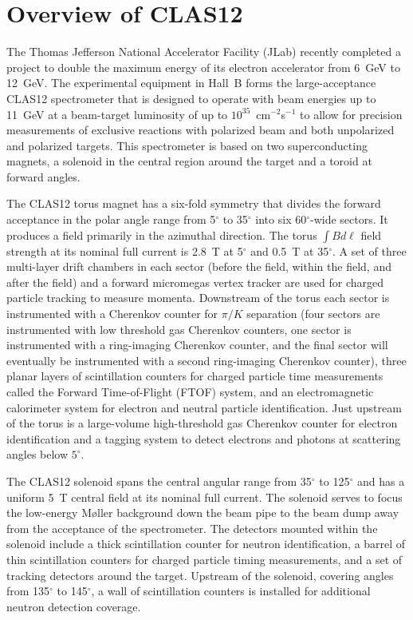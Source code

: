 \documentclass{elsart}
\begin{document}


\section{Overview of CLAS12}

The Thomas Jefferson National Accelerator Facility (JLab) recently completed a project to 
double the maximum energy of its electron accelerator from 6~GeV to 12~GeV. The experimental 
equipment in Hall~B forms the large-acceptance CLAS12 spectrometer that is designed to operate 
with beam energies up to 11~GeV at a beam-target luminosity of up to $10^{35}$~cm$^{-2}$s$^{-1}$
to allow for precision measurements of exclusive reactions with polarized beam and both unpolarized
and polarized targets. This spectrometer is based on two superconducting magnets, a solenoid in the
central region around the target and a toroid at forward angles. 

The CLAS12 torus magnet has a six-fold symmetry that divides the forward acceptance in the polar angle
range from 5$^\circ$ to 35$^\circ$ into six 60$^\circ$-wide sectors. It produces a field primarily in
the azimuthal direction. The torus $\int \!B d\ell$ field strength at its nominal full current is 2.8~T
at 5$^\circ$ and 0.5~T at 35$^\circ$. A set of three multi-layer drift chambers in each sector (before
the field, within the field, and after the field) and a forward micromegas vertex tracker are used for
charged particle tracking to measure momenta. Downstream of the torus each sector is instrumented with
a Cherenkov counter for $\pi/K$ separation (four sectors are instrumented with low threshold gas Cherenkov
counters, one sector is instrumented with a ring-imaging Cherenkov counter, and the final sector will eventually
be instrumented with a second ring-imaging Cherenkov counter), three planar layers of scintillation counters
for charged particle time measurements called the Forward Time-of-Flight (FTOF) system, and an
electromagnetic calorimeter system for electron and neutral particle identification. Just upstream of the torus
is a large-volume high-threshold gas Cherenkov counter for electron identification and a tagging system to
detect electrons and photons at scattering angles below $5^\circ$.

The CLAS12 solenoid spans the central angular range from 35$^\circ$ to 125$^\circ$ and has a uniform
5~T central field at its nominal full current. The solenoid serves to focus the low-energy M{\o}ller
background down the beam pipe to the beam dump away from the acceptance of the spectrometer. The
detectors mounted within the solenoid include a thick scintillation counter for neutron identification, a
barrel of thin scintillation counters for charged particle timing measurements, and a set of tracking
detectors around the target. Upstream of the solenoid, covering angles from 135$^\circ$ to 145$^\circ$,
a wall of scintillation counters is installed for additional neutron detection coverage.
\end{document}
